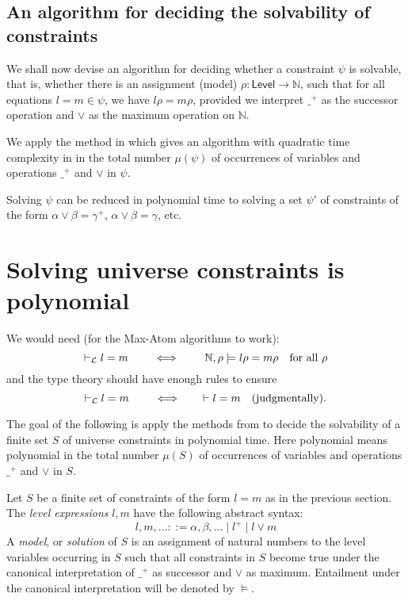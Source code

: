 \documentclass[11pt,a4paper]{article}
\def\Level{\mathsf{Level}}
\begin{document}
\subsection{An algorithm for deciding the solvability of constraints}

We shall now devise an algorithm for deciding whether a constraint $\psi$ is solvable, that is, whether there is an assignment (model) $\rho : \Level \to \mathbb{N}$, such that for all equations $l = m \in \psi$, we have $l\rho = m\rho$, provided we interpret $\_^+$ as the successor operation and $\vee$ as the maximum operation on $\mathbb{N}$.

We apply the method in \cite{BNR08} which gives an algorithm with quadratic time complexity in in the total number $\mu(\psi)$ of occurrences of
variables and operations $\_^+$ and $\vee$ in $\psi$.

Solving $\psi$ can be reduced in polynomial time to solving a set $\psi'$ of
constraints of the form $\alpha\vee\beta = \gamma^+$, $\alpha\vee\beta = \gamma$, etc.

\section{Solving universe constraints is polynomial}\label{sec:P-solvability}

We would need (for the Max-Atom algorithms to work):
\[
\vdash_{\cal L} l=m  \quad \quad \iff \quad \quad \mathbb{N},\rho \models l\rho = m\rho
\text{~~ for all $\rho$}
\]
and the type theory should have enough rules to ensure
\[
\vdash_{\cal L} l=m  \quad \quad \iff \quad \quad \vdash l=m
\text{~~ (judgmentally)}.
\]

The goal of the following is apply the methods from \cite{BNR08} to decide
the solvability of a finite set $S$ of universe constraints in polynomial time.
Here polynomial means polynomial in the total number $\mu(S)$ of occurrences of
variables and operations $\_^+$ and $\vee$ in $S$.

Let $S$ be a finite set of constraints of the form $l=m$ as in the previous section.
The \emph{level expressions} $l,m$ have the following abstract syntax:
\[
l,m,\ldots ::= {\alpha,\beta,\ldots} \mid {l^+} \mid {l\vee m}
\]
A \emph{model}, or \emph{solution} of $S$ is an assignment of natural numbers to
the level variables occurring in $S$ such that all constraints in $S$ become true
under the canonical interpretation of $\_^+$ as successor and $\vee$ as maximum.
Entailment under the canonical interpretation will be denoted by $\models$.
\end{document}
